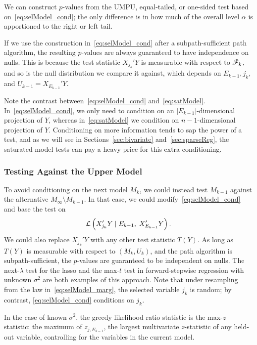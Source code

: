 \documentclass{article}
\begin{document}
We can construct $p$-values from the UMPU, equal-tailed, or one-sided test based on~\eqref{eq:selModel_cond}; the only difference is in how much of the overall level $\alpha$ is apportioned to the right or left tail. 

If we use the construction in~\eqref{eq:selModel_cond} after a subpath-sufficient path algorithm, the resulting $p$-values are always guaranteed to have independence on nulls. This is because the test statistic $X_{j_k}'Y$ is measurable with respect to $\mathscr{F}_k$, and so is the null distribution we compare it against, which depends on $E_{k-1}, j_k,$ and $U_{k-1} = X_{E_{k-1}}'Y$.

Note the contrast between~\eqref{eq:selModel_cond} and~\eqref{eq:satModel}. In~\eqref{eq:selModel_cond}, we only need to condition on an $|E_{k-1}|$-dimensional projection of $Y$, whereas in~\eqref{eq:satModel} we condition on $n-1$-dimensional projection of $Y$. Conditioning on more information tends to sap the power of a test, and as we will see in Sections~\ref{sec:bivariate} and~\ref{sec:sparseReg}, the saturated-model tests can pay a heavy price for this extra conditioning.

\subsubsection{Testing Against the Upper Model}
To avoid conditioning on the next model $M_k$, we could instead test $M_{k-1}$ against the alternative $M_{\infty}\setminus M_{k-1}$. In that case, we could modify~\eqref{eq:selModel_cond} and base the test on
\begin{equation}\label{eq:selModel_marg}
\mathcal{L}\left(X_{j_k}'Y \mid E_{k-1}, \; X_{E_{k-1}}'Y\right).
\end{equation}
We could also replace $X_{j_k}'Y$ with any other test statistic $T(Y)$. As long as $T(Y)$ is measurable with respect to $(M_k, U_k)$, and the path algorithm is subpath-sufficient, the $p$-values are guaranteed to be independent on nulls. The next-$\lambda$ test for the lasso and the max-$t$ test in forward-stepwise regression with unknown $\sigma^2$ are both examples of this approach. Note that under resampling from the law in~\eqref{eq:selModel_marg}, the selected variable $j_k$ is random; by contrast, \eqref{eq:selModel_cond} conditions on $j_k$.

In the case of known $\sigma^2$, the greedy likelihood ratio statistic is the max-$z$ statistic: the maximum of $z_{j,E_{k-1}}$, the largest multivariate $z$-statistic of any held-out variable, controlling for the variables in the current model.
\end{document}
